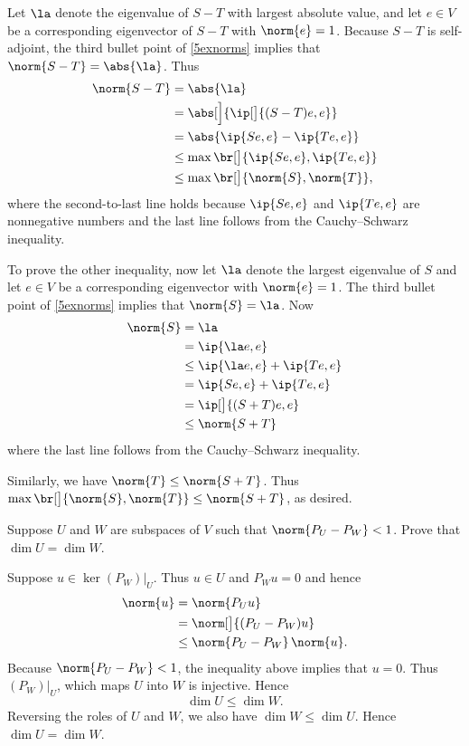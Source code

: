 \begin{Solution}
Let $\la$ denote the eigenvalue of $S-T$ with largest absolute value, and let $e \in V$ be a corresponding eigenvector of $S - T$ with $\norm{e} = 1$. Because $S-T$ is self-adjoint, the third bullet point of \ref{5exnorms} implies that $\norm{S-T} = \abs{\la}$. Thus
\begin{align*}
\norm{S-T} &= \abs{\la} \\
&= \abs[\Big]{ \ip[\big]{ (S-T)e, e} }\\
&= \abs{ \ip{Se,e} - \ip{Te, e} }\\
&\le \max \br[\big]{ \ip{Se, e}, \ip{Te, e} } \\
&\le \max\br[\big]{ \norm{S}, \norm{T} },
\end{align*}
where the second-to-last line holds because $\ip{Se, e}$ and $\ip{Te, e}$ are nonnegative numbers and the last line follows from the Cauchy--Schwarz inequality.

To prove the other inequality, now let $\la$ denote the largest eigenvalue of $S$ and let $e \in V$ be a corresponding eigenvector with $\norm{e} = 1$. The third bullet point of \ref{5exnorms} implies that $\norm{S} = \la$. Now
\begin{align*}
\norm{S} &=  \la \\
&= \ip{\la e, e} \\
&\le \ip{\la e, e} + \ip{Te, e}\\
&= \ip{Se,e} + \ip{Te, e} \\
&= \ip[\big]{ (S+T)e, e} \\
&\le\norm{S+T}
\end{align*}
where the last line follows from the Cauchy--Schwarz inequality.

Similarly, we have $\norm{T} \le \norm{S+T}$. Thus $\max\br[\big]{ \norm{S}, \norm{T} } \le \norm{S+T}$, as desired.
\end{Solution}

\exercise
Suppose $U$ and $W$ are subspaces of $V$ such that $\norm{P_U - P_W} < 1$. Prove that $\dim U = \dim W$.

\begin{Solution}
Suppose $u \in \ker (P_W)|_U$. Thus $u \in U$ and $P_W u = 0$ and hence
\begin{align*}
\norm{u} &= \norm{ P_U u} \\
&= \norm[\big]{ (P_U - P_W) u } \\
&\le \norm{P_U - P_W} \, \norm{u}.
\end{align*}
Because $\norm{P_U - P_W} < 1$, the inequality above implies that $u = 0$. Thus $(P_W)|_U$, which maps $U$ into $W$ is injective. Hence
\[
\dim U \le \dim W.
\]
Reversing the roles of $U$ and $W$, we also have $\dim W \le \dim U$. Hence $\dim U = \dim W$.
\end{Solution}

